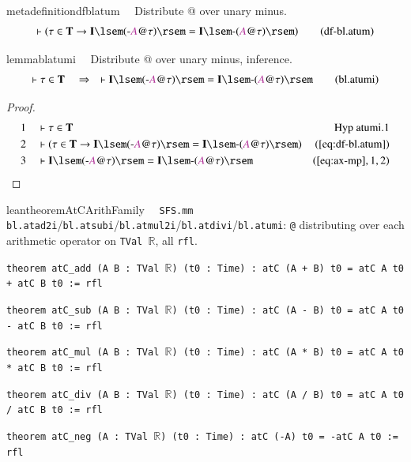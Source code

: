 \begin{restatable}{metadefinition}{dfblatum}~~ Distribute @ over unary minus.
\begin{align}
\vdash ( \tau \in \mathbf{T} \rightarrow \mathbf{I} \lsem ( \textrm{-} \mc{A} @
    \tau ) \rsem = \mathbf{I} \lsem \textrm{-} ( \mc{A} @ \tau ) \rsem
    )\label{eq:df-bl.atum}\tag{df-bl.atum}
\end{align}
\end{restatable}

\begin{restatable}{lemma}{blatumi}~~ Distribute @ over unary minus, inference.
\begin{align}
\vdash \tau \in \mathbf{T}\quad\Rightarrow\quad \vdash \mathbf{I} \lsem (
    \textrm{-} \mc{A} @ \tau ) \rsem = \mathbf{I} \lsem \textrm{-} ( \mc{A} @
    \tau ) \rsem\label{eq:bl.atumi}\tag{bl.atumi}
\end{align}
\end{restatable}

\begin{proof}
\begin{align}
  1 &&  & \vdash \tau \in \mathbf{T}&\text{Hyp~atumi.1}\notag%
  \\ 2 &&  & \vdash ( \tau \in \mathbf{T} \rightarrow \mathbf{I} \lsem (
      \textrm{-} \mc{A} @ \tau ) \rsem = \mathbf{I} \lsem
      \textrm{-} ( \mc{A} @ \tau ) \rsem
      )&(\mbox{\ref{eq:df-bl.atum}})\notag
  \\ 3 &&  & \vdash \mathbf{I} \lsem ( \textrm{-} \mc{A} @ \tau ) \rsem =
      \mathbf{I} \lsem \textrm{-} ( \mc{A} @ \tau )
      \rsem&(\mbox{\ref{eq:ax-mp}},1,2)\notag
\end{align}
\end{proof}

\begin{restatable}{leantheorem}{AtCArithFamily}~~ \texttt{SFS.mm} \texttt{bl.atad2i}/\texttt{bl.atsubi}/\texttt{bl.atmul2i}/\texttt{bl.atdivi}/\texttt{bl.atumi}: \texttt{@} distributing over each arithmetic operator on \texttt{TVal $\mathbb{R}$}, all \texttt{rfl}.

\texttt{\textcolor{leancolor}{theorem} \textcolor{leanyellow}{atC\_add} (A B : TVal $\mathbb{R}$) (t0 : Time) : atC (A + B) t0 = atC A t0 + atC B t0 := rfl}

\texttt{\textcolor{leancolor}{theorem} \textcolor{leanyellow}{atC\_sub} (A B : TVal $\mathbb{R}$) (t0 : Time) : atC (A - B) t0 = atC A t0 - atC B t0 := rfl}

\texttt{\textcolor{leancolor}{theorem} \textcolor{leanyellow}{atC\_mul} (A B : TVal $\mathbb{R}$) (t0 : Time) : atC (A * B) t0 = atC A t0 * atC B t0 := rfl}

\texttt{\textcolor{leancolor}{theorem} \textcolor{leanyellow}{atC\_div} (A B : TVal $\mathbb{R}$) (t0 : Time) : atC (A / B) t0 = atC A t0 / atC B t0 := rfl}

\texttt{\textcolor{leancolor}{theorem} \textcolor{leanyellow}{atC\_neg} (A : TVal $\mathbb{R}$) (t0 : Time) : atC (-A) t0 = -atC A t0 := rfl}
\label{atC_add}
\label{atC_sub}
\label{atC_mul}
\label{atC_div}
\label{atC_neg}
\end{restatable}

